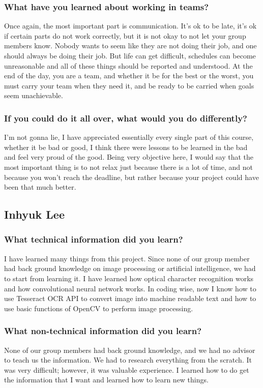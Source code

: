 \documentclass[article, onecolumn, draftclsnofoot,10pt, compsoc]{IEEEtran}
\begin{document}
\subsubsection{What have you learned about working in teams?}
Once again, the most important part is communication. It’s ok to be late, it’s ok if certain parts do not work correctly, but it is not okay to not let your group members know. Nobody wants to seem like they are not doing their job, and one should always be doing their job. But life can get difficult, schedules can become unreasonable and all of these things should be reported and understood. At the end of the day, you are a team, and whether it be for the best or the worst, you must carry your team when they need it, and be ready to be carried when goals seem unachievable. 

\subsubsection{If you could do it all over, what would you do differently?}
I’m not gonna lie, I have appreciated essentially every single part of this course, whether it be bad or good, I think there were lessons to be learned in the bad and feel very proud of the good. Being very objective here, I would say that the most important thing is to not relax just because there is a lot of time, and not because you won’t reach the deadline, but rather because your project could have been that much better. 

\subsection{Inhyuk Lee}
\subsubsection{What technical information did you learn?}
I have learned many things from this project. Since none of our group member had back ground knowledge on image processing or artificial intelligence, we had to start from learning it. I have learned how optical character recognition works and how convolutional neural network works. In coding wise, now I know how to use Tesseract OCR API to convert image into machine readable text and how to use basic functions of OpenCV to perform image processing. 

\subsubsection{What non-technical information did you learn?}
None of our group members had back ground knowledge, and we had no advisor to teach us the information. We had to research everything from the scratch. It was very difficult; however, it was valuable experience. I learned how to do get the information that I want and learned how to learn new things. 
\end{document}
